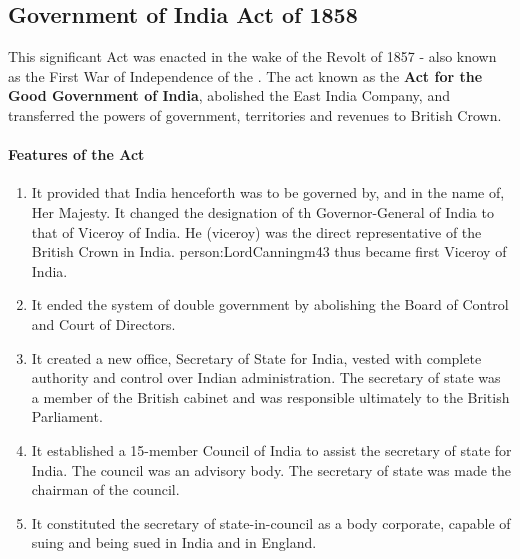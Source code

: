 \subsection*{Government of India Act of 1858}

This significant Act was enacted in the wake of the Revolt of 1857 - also known as the First War of Independence of the . The act known as the \textbf{Act for the Good Government of India}, abolished the East India Company, and transferred the powers of government, territories and revenues to British Crown.

\paragraph{Features of the Act}
\begin{enumerate}
  \item It provided that India henceforth was to be governed by, and in the name of, Her Majesty. It changed the designation of th Governor-General of India to that of Viceroy of India. He (viceroy) was the direct representative of the British Crown in India. \gls{person:LordCanningm43} thus became first Viceroy of India.
  \item It ended the system of double government by abolishing the Board of Control and Court of Directors.
  \item It created a new office, Secretary of State for India, vested with complete authority and control over Indian administration. The secretary of state was a member of the British cabinet and was responsible ultimately to the British Parliament.
  \item It established a 15-member Council of India to assist the secretary of state for India. The council was an advisory body. The secretary of state was made the chairman of the council.
  \item It constituted the secretary of state-in-council as a body corporate, capable of suing and being sued in India and in England.
\end{enumerate}



